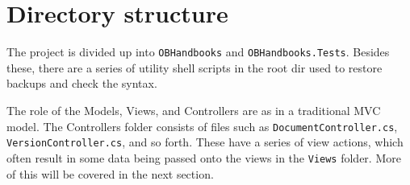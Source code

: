 \section{Directory structure}
The project is divided up into \texttt{OBHandbooks} and \texttt{OBHandbooks.Tests}.
Besides these, there are a series of utility shell scripts in the root dir used to restore backups and check the syntax.

The role of the Models, Views, and Controllers are as in a traditional MVC model.
The Controllers folder consists of files such as \texttt{DocumentController.cs}, \texttt{VersionController.cs}, and so forth.
These have a series of view actions, which often result in some data being passed onto the views in the \texttt{Views} folder.
More of this will be covered in the next section.
